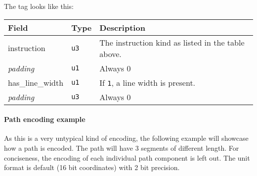\documentclass[]{article}
\begin{document}
The tag looks like this:

\begin{longtable}[]{@{}p{1in}p{0.5in}p{4.5in}@{}}
\toprule
Field & Type & Description \\
\midrule
\endhead
instruction & \texttt{u3} & The instruction kind as listed in the table above. \\
\emph{padding} & \texttt{u1} & Always 0 \\
has\_line\_width & \texttt{u1} & If \texttt{1}, a line width is present. \\
\emph{padding} & \texttt{u3} & Always 0 \\
\bottomrule
\end{longtable}

\paragraph{Path encoding example} As this is a very untypical kind of encoding, the following example will showcase how a path is encoded. The path will have 3 segments of different length. For conciseness, the encoding of each individual path component is left out. The unit format is default (16 bit coordinates) with 2 bit precision.
\end{document}
